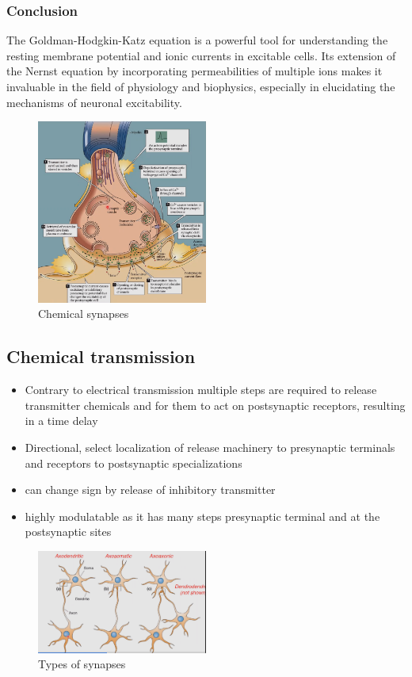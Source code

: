 \documentclass{article}
\begin{document}
\subsubsection{Conclusion}

The Goldman-Hodgkin-Katz equation is a powerful tool for understanding the resting membrane potential and ionic currents in excitable cells. Its extension of the Nernst equation by incorporating permeabilities of multiple ions makes it invaluable in the field of physiology and biophysics, especially in elucidating the mechanisms of neuronal excitability.
\begin{figure}[H]
\centering
\includegraphics[width=0.5\textwidth]{assets/chemical-synapses.png}
\caption{Chemical synapses}
\end{figure}

\subsection{Chemical transmission}

\begin{itemize}
    \item Contrary to electrical transmission multiple steps are required to release transmitter chemicals and for them to act on postsynaptic receptors, resulting in a time delay
    \item Directional, select localization of release machinery to presynaptic terminals and receptors to postsynaptic specializations
    \item can change sign by release of inhibitory transmitter
    \item highly modulatable as it has many steps presynaptic terminal and at the postsynaptic sites
\end{itemize}

\begin{figure}[H]
\centering
\includegraphics[width=0.5\textwidth]{assets/types-of-synapses.png}
\caption{Types of synapses}
\end{figure}
\end{document}
